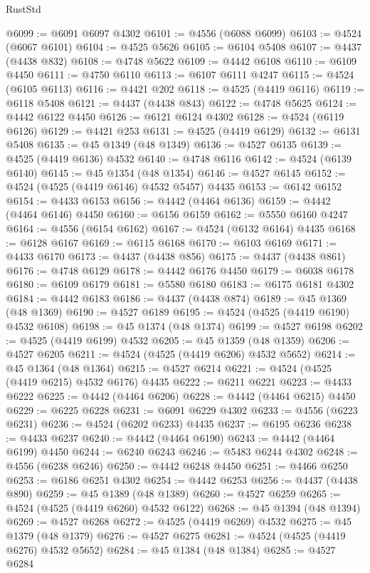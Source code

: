 \begin{lexlean}{RustStd}
\begin{coremodule}
@6099 := @6091 @6097 @4302
@6101 := @4556 (@6088 @6099)
@6103 := @4524 (@6067 @6101)
@6104 := @4525 @5626
@6105 := @6104 @5408
@6107 := @4437 (@4438 @832)
@6108 := @4748 @5622
@6109 := @4442 @6108
@6110 := @6109 @4450
@6111 := @4750 @6110
@6113 := @6107 @6111 @4247
@6115 := @4524 (@6105 @6113)
@6116 := @4421 @202
@6118 := @4525 (@4419 @6116)
@6119 := @6118 @5408
@6121 := @4437 (@4438 @843)
@6122 := @4748 @5625
@6124 := @4442 @6122 @4450
@6126 := @6121 @6124 @4302
@6128 := @4524 (@6119 @6126)
@6129 := @4421 @253
@6131 := @4525 (@4419 @6129)
@6132 := @6131 @5408
@6135 := @45 @1349 (@48 @1349)
@6136 := @4527 @6135
@6139 := @4525 (@4419 @6136) @4532
@6140 := @4748 @6116
@6142 := @4524 (@6139 @6140)
@6145 := @45 @1354 (@48 @1354)
@6146 := @4527 @6145
@6152 := @4524 (@4525 (@4419 @6146) @4532 @5457) @4435
@6153 := @6142 @6152
@6154 := @4433 @6153
@6156 := @4442 (@4464 @6136)
@6159 := @4442 (@4464 @6146) @4450
@6160 := @6156 @6159
@6162 := @5550 @6160 @4247
@6164 := @4556 (@6154 @6162)
@6167 := @4524 (@6132 @6164) @4435
@6168 := @6128 @6167
@6169 := @6115 @6168
@6170 := @6103 @6169
@6171 := @4433 @6170
@6173 := @4437 (@4438 @856)
@6175 := @4437 (@4438 @861)
@6176 := @4748 @6129
@6178 := @4442 @6176 @4450
@6179 := @6038 @6178
@6180 := @6109 @6179
@6181 := @5580 @6180
@6183 := @6175 @6181 @4302
@6184 := @4442 @6183
@6186 := @4437 (@4438 @874)
@6189 := @45 @1369 (@48 @1369)
@6190 := @4527 @6189
@6195 := @4524 (@4525 (@4419 @6190) @4532 @6108)
@6198 := @45 @1374 (@48 @1374)
@6199 := @4527 @6198
@6202 := @4525 (@4419 @6199) @4532
@6205 := @45 @1359 (@48 @1359)
@6206 := @4527 @6205
@6211 := @4524 (@4525 (@4419 @6206) @4532 @5652)
@6214 := @45 @1364 (@48 @1364)
@6215 := @4527 @6214
@6221 := @4524 (@4525 (@4419 @6215) @4532 @6176) @4435
@6222 := @6211 @6221
@6223 := @4433 @6222
@6225 := @4442 (@4464 @6206)
@6228 := @4442 (@4464 @6215) @4450
@6229 := @6225 @6228
@6231 := @6091 @6229 @4302
@6233 := @4556 (@6223 @6231)
@6236 := @4524 (@6202 @6233) @4435
@6237 := @6195 @6236
@6238 := @4433 @6237
@6240 := @4442 (@4464 @6190)
@6243 := @4442 (@4464 @6199) @4450
@6244 := @6240 @6243
@6246 := @5483 @6244 @4302
@6248 := @4556 (@6238 @6246)
@6250 := @4442 @6248 @4450
@6251 := @4466 @6250
@6253 := @6186 @6251 @4302
@6254 := @4442 @6253
@6256 := @4437 (@4438 @890)
@6259 := @45 @1389 (@48 @1389)
@6260 := @4527 @6259
@6265 := @4524 (@4525 (@4419 @6260) @4532 @6122)
@6268 := @45 @1394 (@48 @1394)
@6269 := @4527 @6268
@6272 := @4525 (@4419 @6269) @4532
@6275 := @45 @1379 (@48 @1379)
@6276 := @4527 @6275
@6281 := @4524 (@4525 (@4419 @6276) @4532 @5652)
@6284 := @45 @1384 (@48 @1384)
@6285 := @4527 @6284

\end{coremodule}
\end{lexlean}
